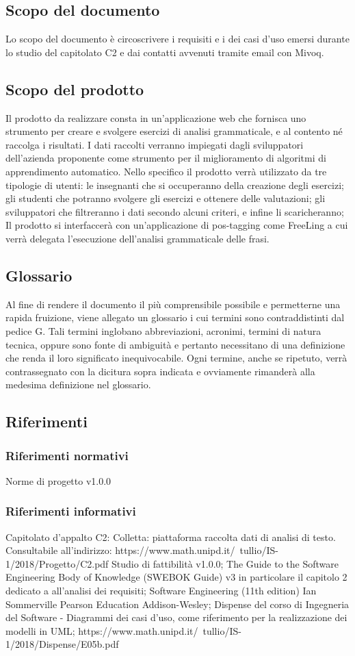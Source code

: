 \subsection{Scopo del documento}
Lo scopo del documento è circoscrivere i requisiti e i dei casi d’uso emersi durante lo studio del capitolato C2 e dai contatti avvenuti tramite email con Mivoq.
\subsection{Scopo del prodotto}
Il prodotto da realizzare consta in un’applicazione web che fornisca uno strumento per creare e svolgere esercizi di analisi grammaticale, e al contento né raccolga i risultati. I dati raccolti verranno impiegati dagli sviluppatori dell’azienda proponente come strumento per il miglioramento di algoritmi di apprendimento automatico. Nello specifico il prodotto verrà utilizzato da tre tipologie di utenti:
le insegnanti che si occuperanno della creazione degli esercizi;
gli studenti che potranno svolgere gli esercizi e ottenere delle valutazioni; 
gli sviluppatori che filtreranno i dati secondo alcuni criteri, e infine li scaricheranno;\\Il prodotto si interfaccerà con un’applicazione di pos-tagging come FreeLing a cui verrà delegata l’esecuzione dell’analisi grammaticale delle frasi.
\subsection{Glossario}
Al fine di rendere il documento il più comprensibile possibile e permetterne una rapida fruizione, viene allegato un glossario i cui termini sono contraddistinti dal pedice G. Tali termini inglobano abbreviazioni, acronimi, termini di natura tecnica, oppure sono fonte di ambiguità e pertanto necessitano di una definizione che renda il loro significato inequivocabile. 
Ogni termine, anche se ripetuto, verrà contrassegnato con la dicitura sopra indicata e ovviamente rimanderà alla medesima definizione nel glossario.
\subsection{Riferimenti}
\subsubsection{Riferimenti normativi}
Norme di progetto v1.0.0
\subsubsection{Riferimenti informativi}
Capitolato d’appalto C2: Colletta: piattaforma raccolta dati di analisi di testo. Consultabile all’indirizzo:
https://www.math.unipd.it/~tullio/IS-1/2018/Progetto/C2.pdf
Studio di fattibilità v1.0.0;
The Guide to the Software Engineering Body of Knowledge (SWEBOK Guide) v3 in particolare il capitolo 2 dedicato a all’analisi dei requisiti;
Software Engineering (11th edition) Ian Sommerville Pearson Education Addison-Wesley; 
Dispense del corso di Ingegneria del Software - Diagrammi dei casi d’uso, come riferimento per la realizzazione dei modelli in UML;
https://www.math.unipd.it/~tullio/IS-1/2018/Dispense/E05b.pdf
\newpage
